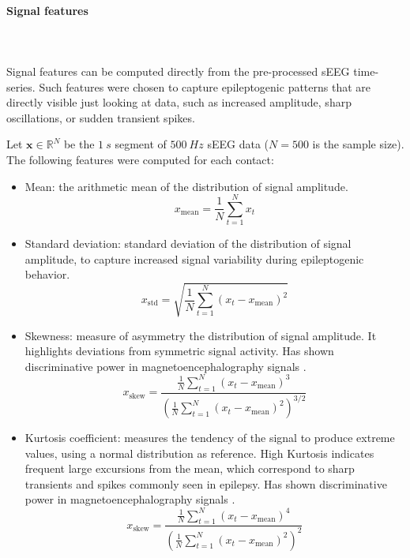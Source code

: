 \paragraph{Signal features}~\\
\\
Signal features can be computed directly from the pre-processed sEEG time-series.
Such features were chosen to capture epileptogenic patterns that are directly
visible just looking at data, such as increased amplitude, sharp oscillations, 
or sudden transient spikes.

Let $\mathbf{x}\in\mathbb{R}^N$ be the $1\ s$ segment of $500\ Hz$ sEEG
data ($N=500$ is the sample size).
The following features were computed for each contact:
\begin{itemize}
    \item Mean: the arithmetic mean of the distribution of signal amplitude.
    \begin{equation}
        x_\text{mean}=\frac{1}{N}\sum_{t=1}^N x_t
    \end{equation}
    \item Standard deviation: standard deviation of the distribution of signal
    amplitude, to capture increased signal variability during epileptogenic
    behavior.
    \begin{equation}
        x_\text{std}=
        \sqrt{\frac{1}{N}\sum_{t=1}^N (x_t-x_\text{mean})^2}
    \end{equation}
        
    \item Skewness: measure of asymmetry the distribution of signal amplitude.
    It highlights deviations from symmetric signal activity.
    Has shown discriminative power in magnetoencephalography signals
    \cite{skewkurt}.
    \begin{equation}
        x_\text{skew} =
        \frac{
        \frac{1}{N}\sum_{t=1}^N(x_t-x_\text{mean})^3
        }{
        \left(
        \frac{1}{N}\sum_{t=1}^N(x_t-x_\text{mean})^2
        \right)^{3/2}
        }
    \end{equation}

    \item Kurtosis coefficient: measures the tendency of the signal to produce
    extreme values, using a normal distribution as reference.
    High Kurtosis indicates frequent large excursions from the mean, which
    correspond to sharp transients and spikes commonly seen in epilepsy.
    Has shown discriminative power in magnetoencephalography signals
    \cite{skewkurt}.
    \begin{equation}
        x_\text{skew} =
        \frac{
        \frac{1}{N}\sum_{t=1}^N(x_t-x_\text{mean})^4
        }{
        \left(
        \frac{1}{N}\sum_{t=1}^N(x_t-x_\text{mean})^2
        \right)^2
        }
    \end{equation}
    

\end{itemize}
